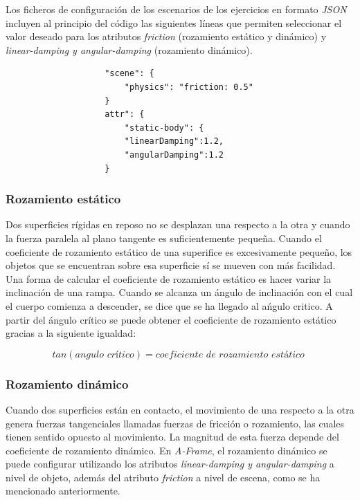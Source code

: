 Los ficheros de configuración de los escenarios de los ejercicios en formato \textit{JSON} incluyen al principio del código las siguientes líneas que permiten seleccionar el valor deseado para los atributos \textit{friction} (rozamiento estático y dinámico) y \textit{linear-damping y angular-damping} (rozamiento dinámico).

\small
\begin{verbatim}
                    "scene": {
                        "physics": "friction: 0.5"
                    }
                    attr": {
                        "static-body": {
                        "linearDamping":1.2,
                        "angularDamping":1.2
                    }
\end{verbatim}

\normalsize
\subsubsection{Rozamiento estático}
Dos superficies rígidas en reposo no se desplazan una respecto a la otra y cuando la fuerza paralela al plano tangente es suficientemente pequeña. Cuando el coeficiente de rozamiento estático de una superifice es excesivamente pequeño, los objetos que se encuentran sobre esa superficie sí se mueven con más facilidad. Una forma de calcular el coeficiente de rozamiento estático es hacer variar la inclinación de una rampa. Cuando se alcanza un ángulo de inclinación con el cual el cuerpo comienza a descender, se dice que se ha llegado al ańgulo critico. A partir del ángulo crítico se puede obtener el coeficiente de rozamiento estático gracias a la siguiente igualdad:

\begin{equation}
    tan(angulo \,\, crítico) = coeficiente \,\, de \,\, rozamiento \,\, estático \,\,
\end{equation}

\subsubsection{Rozamiento dinámico}
Cuando dos superficies están en contacto, el movimiento de una respecto a la otra genera fuerzas tangenciales llamadas fuerzas de fricción o rozamiento, las cuales tienen sentido opuesto al movimiento. La magnitud de esta fuerza depende del coeficiente de rozamiento dinámico. En \textit{A-Frame}, el rozamiento dinámico se puede configurar utilizando los atributos \textit{linear-damping y angular-damping} a nivel de objeto, además del atributo \textit{friction} a nivel de escena, como se ha mencionado anteriormente. 



